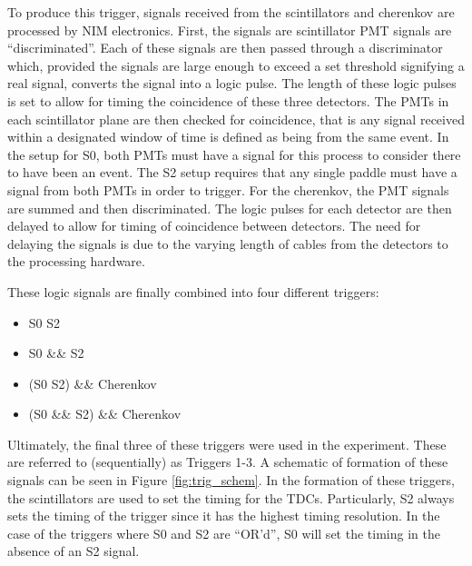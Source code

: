 To produce this trigger, signals received from the scintillators and cherenkov are processed by NIM electronics. First, the signals are scintillator PMT signals are ``discriminated''. Each of these signals are then passed through a discriminator which, provided the signals are large enough to exceed a set threshold signifying a real signal, converts the signal into a logic pulse. The length of these logic pulses is set to allow for timing the coincidence of these three detectors. The PMTs in each scintillator plane are then checked for coincidence, that is any signal received within a designated window of time is defined as being from the same event. In the setup for S0, both PMTs must have a signal for this process to consider there to have been an event. The S2 setup requires that any single paddle must have a signal from both PMTs in order to trigger. For the cherenkov, the PMT signals are summed and then discriminated. The logic pulses for each detector are then delayed to allow for timing of coincidence between detectors. The need for delaying the signals is due to the varying length of cables from the detectors to the processing hardware.

These logic signals are finally combined into four different triggers:
\begin{itemize}
	\item S0 \textbar\textbar{} S2
	\item S0 \&\& S2
	\item (S0 \textbar\textbar{} S2) \&\& Cherenkov
	\item (S0 \&\& S2) \&\& Cherenkov
\end{itemize}
Ultimately, the final three of these triggers were used in the experiment. These are referred to (sequentially) as Triggers 1-3. A schematic of formation of these signals can be seen in Figure \ref{fig:trig_schem}. In the formation of these triggers, the scintillators are used to set the timing for the TDCs. Particularly, S2 always sets the timing of the trigger since it has the highest timing resolution. In the case of the triggers where S0 and S2 are ``OR'd'', S0 will set the timing in the absence of an S2 signal.

